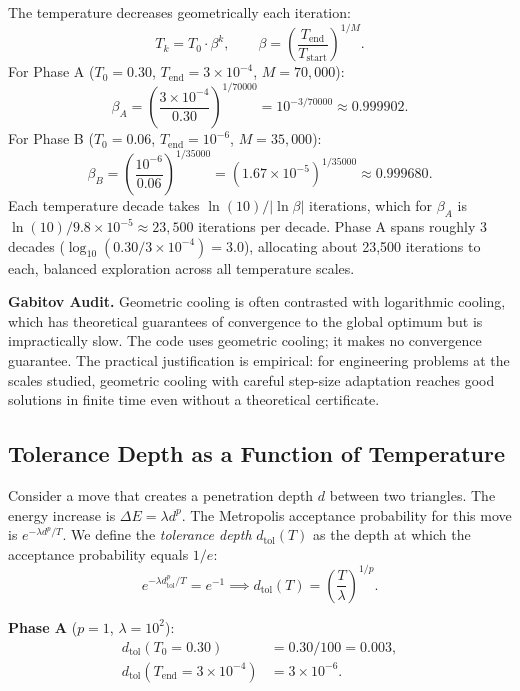 \documentclass[11pt,oneside]{article}
\newcommand{\gabitov}[1]{\begin{gabitovbox}\textbf{Gabitov Audit.} #1\end{gabitovbox}}
\begin{document}
The temperature decreases geometrically each iteration:
\begin{equation}
  T_k = T_0 \cdot \beta^k,
  \qquad
  \beta = \left(\frac{T_{\mathrm{end}}}{T_{\mathrm{start}}}\right)^{1/M}.
  \label{eq:cool}
\end{equation}
For Phase A ($T_0 = 0.30$, $T_{\mathrm{end}} = 3 \times 10^{-4}$,
$M = 70{,}000$):
\[
  \beta_A = \left(\frac{3 \times 10^{-4}}{0.30}\right)^{1/70000}
  = 10^{-3/70000} \approx 0.999902.
\]
For Phase B ($T_0 = 0.06$, $T_{\mathrm{end}} = 10^{-6}$, $M = 35{,}000$):
\[
  \beta_B = \left(\frac{10^{-6}}{0.06}\right)^{1/35000}
  = (1.67 \times 10^{-5})^{1/35000} \approx 0.999680.
\]
Each temperature decade takes $\ln(10) / |\ln \beta|$ iterations,
which for $\beta_A$ is $\ln(10)/9.8 \times 10^{-5} \approx 23{,}500$
iterations per decade. Phase A spans roughly 3 decades
($\log_{10}(0.30/3 \times 10^{-4}) = 3.0$), allocating about 23{,}500
iterations to each, balanced exploration across all temperature scales.

\gabitov{%
Geometric cooling is often contrasted with logarithmic cooling, which
has theoretical guarantees of convergence to the global optimum but is
impractically slow. The code uses geometric cooling; it makes no
convergence guarantee. The practical justification is empirical: for
engineering problems at the scales studied, geometric cooling with
careful step-size adaptation reaches good solutions in finite time
even without a theoretical certificate.%
}

\subsection{Tolerance Depth as a Function of Temperature}

Consider a move that creates a penetration depth $d$ between two
triangles. The energy increase is $\Delta E = \lambda d^p$. The
Metropolis acceptance probability for this move is $e^{-\lambda d^p /
T}$. We define the \emph{tolerance depth} $d_{\mathrm{tol}}(T)$ as the
depth at which the acceptance probability equals $1/e$:
\begin{equation}
  e^{-\lambda d_{\mathrm{tol}}^p / T} = e^{-1}
  \implies
  d_{\mathrm{tol}}(T) = \left(\frac{T}{\lambda}\right)^{1/p}.
  \label{eq:dtol}
\end{equation}

\textbf{Phase A} ($p = 1$, $\lambda = 10^2$):
\begin{align*}
  d_{\mathrm{tol}}(T_0 = 0.30) &= 0.30 / 100 = 0.003, \\
  d_{\mathrm{tol}}(T_{\mathrm{end}} = 3 \times 10^{-4}) &= 3 \times 10^{-6}.
\end{align*}
\end{document}
